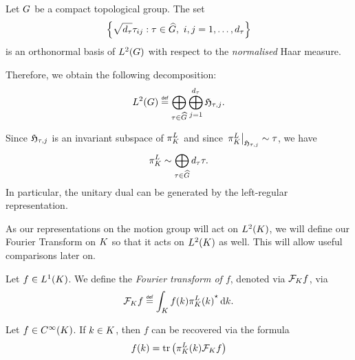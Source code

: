 \begin{theorem}
\label{theorem:Peter-Weyl_theorem}
    Let $\Group$ be a compact topological group.
    The set
    \begin{align*}
        \left\{
            \sqrt{\dimRep\tau} \tau_{ij} : \tau \in \dualGroup\Group,\ i, j = 1, \dots, \dimRep\tau
        \right\}
    \end{align*}
    is an orthonormal basis of $\Lebesgue{2}{\Group}$ with respect to the \emph{normalised} Haar measure.

    Therefore, we obtain the following decomposition:
    \begin{align*}
        \Lebesgue{2}{\Group} \defeq
        \bigoplus_{\tau \in \dualGroup\Group} \bigoplus_{j = 1}^{\dimRep \tau} \Hilbert{\tau}{j}.
    \end{align*}

    Since $\Hilbert{\tau}{j}$ is an invariant subspace of $\LeftRegularRepresentation$
    and since $\eval{\LeftRegularRepresentation}{\Hilbert{\tau}{j}} \sim \tau$,
    we have
    \begin{align*}
        \LeftRegularRepresentation \sim
        \bigoplus_{\tau \in \dualGroup\Group} \dimRep\tau \tau.
    \end{align*}
    In particular, the unitary dual can be generated by the left-regular representation.
\end{theorem}

As our representations on the motion group will act on $\Lebesgue{2}\CompactGroup$,
we will define our Fourier Transform on $\CompactGroup$ so that it acts on $\Lebesgue{2}\CompactGroup$ as well.
This will allow useful comparisons later on.

\begin{definition}
    Let $f \in \Lebesgue{1}\CompactGroup$.
    We define the \emph{Fourier transform of $f$}, denoted via $\Fourier[\CompactGroup] f$, via
    \begin{align*}
        \Fourier[\CompactGroup] f \defeq \int_\CompactGroup f(k) \adj{\LeftRegularRepresentation(k)} \dd k.
    \end{align*}
\end{definition}

\begin{proposition}
    Let $f \in \SmoothFunctions\CompactGroup$.
    If $k \in \CompactGroup$,
    then $f$ can be recovered via the formula
    \begin{align*}
        f(k) = \tr\left(\LeftRegularRepresentation(k) \Fourier[\CompactGroup] f \right)
    \end{align*}
\end{proposition}


